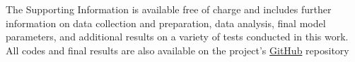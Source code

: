 \documentclass[journal=jacsat,manuscript=article, ]{achemso}
\begin{document}
\begin{suppinfo}
The Supporting Information is available free of charge and includes further information on data collection and preparation, data analysis, final model parameters, and additional results on a variety of tests conducted in this work.
All codes and final results are also available on the project's \href{https://github.com/MaginnGroup/GCGP/tree/master}{GitHub} repository


\end{suppinfo}



\end{document}
